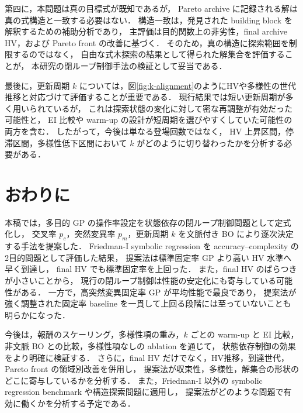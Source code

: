 \documentclass[a4paper,10pt,twocolumn]{ltjsarticle}
\begin{document}
第四に，本問題は真の目標式が既知であるが，
Pareto archive に記録される解は真の式構造と一致する必要はない．
構造一致は，発見された building block を解釈するための補助分析であり，
主評価は目的関数上の非劣性，final archive HV，および Pareto front の改善に基づく．
そのため，真の構造に探索範囲を制限するのではなく，
自由な式木探索の結果として得られた解集合を評価することが，
本研究の閉ループ制御手法の検証として妥当である．

最後に，更新周期 \(k\) については，図\ref{fig:k-alignment}のようにHVや多様性の世代推移と対応づけて評価することが重要である．
現行結果では短い更新周期が多く用いられているが，
これは探索状態の変化に対して密な再調整が有効だった可能性と，
EI 比較や warm-up の設計が短周期を選びやすくしていた可能性の両方を含む．
したがって，今後は単なる登場回数ではなく，
HV 上昇区間，停滞区間，多様性低下区間において \(k\) がどのように切り替わったかを分析する必要がある．

\section{おわりに}

本稿では，多目的 GP の操作率設定を状態依存の閉ループ制御問題として定式化し，
交叉率 \(p_c\)，突然変異率 \(p_m\)，更新周期 \(k\) を文脈付き BO により逐次決定する手法を提案した．
Friedman-I symbolic regression を accuracy--complexity の2目的問題として評価した結果，
提案法は標準固定率 GP より高い HV 水準へ早く到達し，
final HV でも標準固定率を上回った．
また，final HV のばらつきが小さいことから，
現行の閉ループ制御は性能の安定化にも寄与している可能性がある．
一方で，高突然変異固定率 GP が平均性能で最良であり，
提案法が強く調整された固定率 baseline を一貫して上回る段階には至っていないことも明らかになった．

今後は，報酬のスケーリング，多様性項の重み，\(k\) ごとの warm-up と EI 比較，
非文脈 BO との比較，多様性項なしの ablation を通じて，
状態依存制御の効果をより明確に検証する．
さらに，final HV だけでなく，HV推移，到達世代，Pareto front の領域別改善を併用し，
提案法が収束性，多様性，解集合の形状のどこに寄与しているかを分析する．
また，Friedman-I 以外の symbolic regression benchmark や構造探索問題に適用し，
提案法がどのような問題で有効に働くかを分析する予定である．
\end{document}
